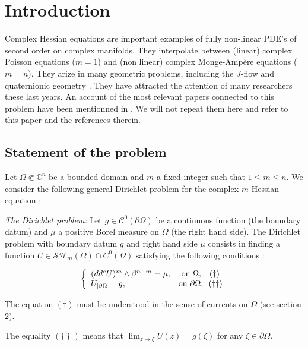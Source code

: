 \documentclass[12pt]{amsart}
\theoremstyle{definition}
\numberwithin{theorem}{section}
\numberwithin{equation}{section}
\newcommand{\C}{\mathbb{C}}
\begin{document}
\section*{Introduction}


Complex Hessian equations are important examples of fully non-linear PDE's of second order on complex manifolds.  They interpolate between (linear) complex Poisson equations ($m = 1$) and (non linear) complex Monge-Amp\`ere equations ($m=n$).
 They arize in many geometric problems, including the $J$-flow
\cite{SW} and quaternionic geometry \cite{AV}. They have attracted the attention of many researchers these last years. An account of the most relevant papers connected to this problem have been mentionned in \cite{BZ20}. We will not repeat them here and refer to this paper and the references therein.
 
 
 \subsection{Statement of the problem}
 
Let $\Omega \Subset \C^n$ be a bounded domain and $m$  a fixed integer such that $1 \leq m \leq n$. 
We consider the following general Dirichlet problem for the complex $m$-Hessian equation : 

\smallskip
\smallskip

{\it The Dirichlet problem:} Let $g \in \mathcal{C}^{0} (\partial \Omega)$ be a continuous function (the boundary  datum) and $\mu$ a  positive Borel measure  on $\Omega$ (the right hand side). The Dirichlet problem with boundary datum $g$ and right hand side $\mu$ consists in finding a function $ U \in \mathcal{SH}_m (\Omega) \cap C^{0} (\Omega)$  satisfying the following conditions :   

\begin{equation}\label{eq:DirPb}
\left\{\begin{array}{lcl} 
 (dd^c U)^m \wedge \beta^{n - m} = \mu,  &\hbox{on}\  \Omega, \, \, \, \, \, (\dag)\\
  U_{\mid  \partial \Omega} = g, & \hbox{on}\  \partial \Omega, \, \, \, (\dag \dag)
\end{array}\right.
\end{equation}
 
The  equation $(\dag)$ must be understood in the sense  of currents  on $\Omega$ (see section 2). 

The equality $ (\dag \dag)$ means that $\lim_{z \to \zeta} U (z) = g (\zeta)$ for any $\zeta \in \partial \Omega$. 
\end{document}
